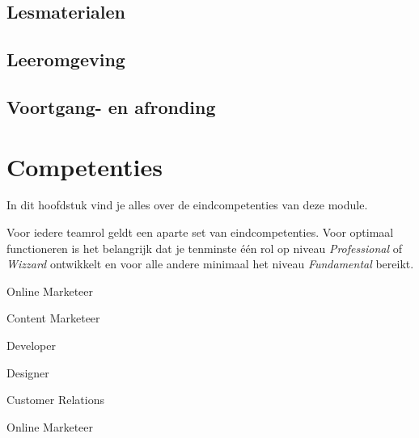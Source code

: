 \documentclass[]{book}
\begin{document}
\section{Lesmaterialen}\label{lesmaterialen}

\section{Leeromgeving}\label{leeromgeving}

\section{Voortgang- en afronding}\label{voortgang--en-afronding}

\chapter{Competenties}\label{competenties}

In dit hoofdstuk vind je alles over de eindcompetenties van deze module.

Voor iedere teamrol geldt een aparte set van eindcompetenties. Voor
optimaal functioneren is het belangrijk dat je tenminste één rol op
niveau \emph{Professional} of \emph{Wizzard} ontwikkelt en voor alle
andere minimaal het niveau \emph{Fundamental} bereikt.

Online Marketeer

Content Marketeer

Developer

Designer

Customer Relations

Online Marketeer
\end{document}
